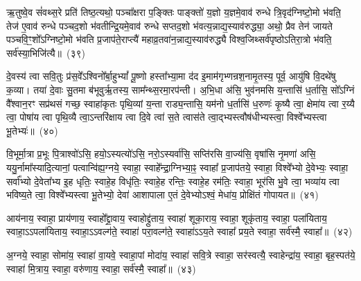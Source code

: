 ऋ॒तुष्वे॒व सं॑वथ्स॒रे प्रति॑ तिष्ठ॒त्यथो॒ पञ्चा᳚क्षरा प॒ङ्क्तिः पाङ्क्तो॑ य॒ज्ञो य॒ज्ञमे॒वाव॑ रुन्धे त्रि॒वृद॑ग्निष्टो॒मो भ॑वति॒ तेज॑ ए॒वाव॑ रुन्धे पञ्चद॒शो भ॑वतीन्द्रि॒यमे॒वाव॑ रुन्धे सप्तद॒शो भ॑वत्य॒न्नाद्य॒स्याव॑रुद्ध्या॒ अथो॒ प्रैव तेन॑ जायते पञ्चवि॒ꣳ॒शो᳚\-ऽग्निष्टो॒मो भ॑वति प्र॒जा\-प॑ते॒राप्त्यै॑ महाव्र॒तवा॑न॒न्नाद्य॒स्याव॑रुद्ध्यै विश्व॒जिथ्सर्व॑पृष्ठो\-ऽतिरा॒त्रो भ॑वति॒ सर्व॑स्या॒भिजि॑त्यै॥~(३९)

{\anuvakamend[{ते व्याव॑र्तन्त प्रवदि॒ता स्या॒मिति॒ स ए॒तं प॑ञ्चरा॒त्रमा सं॑वथ्स॒रो॑\-ऽभिजि॑त्यै}]}%

दे॒वस्य॑ त्वा सवि॒तुः प्र॑स॒वे᳚\-ऽश्विनो᳚र्बा॒हु\-भ्यां᳚ पू॒ष्णो हस्ता᳚भ्या॒मा द॑द इ॒माम॑गृभ्णन्रश॒नामृ॒तस्य॒ पूर्व॒ आयु॑षि वि॒दथे॑षु क॒व्या। तया॑ दे॒वाः सु॒तमा ब॑भूवुर्\mbox{}ऋ॒तस्य॒ साम᳚न्थ्स॒रमा॒रप॑न्ती। अ॒भि॒धा अ॑सि॒ भुव॑नमसि य॒न्तासि॑ ध॒र्तासि॒ सो᳚\-ऽग्निं वै᳚श्वान॒रꣳ सप्र॑थसं गच्छ॒ स्वाहा॑कृतः पृथि॒व्यां य॒न्ता राड्य॒न्तासि॒ यम॑नो ध॒र्तासि॑ ध॒रुणः॑ कृ॒ष्यै त्वा॒ क्षेमा॑य त्वा र॒य्यै त्वा॒ पोषा॑य त्वा पृथि॒व्यै त्वा॒ऽन्तरि॑क्षाय त्वा दि॒वे त्वा॑ स॒ते त्वास॑ते त्वा॒द्भ्यस्त्वौष॑धीभ्यस्त्वा॒ विश्वे᳚भ्यस्त्वा भू॒तेभ्यः॑॥~(४०)

{\anuvakamend[{ध॒रुणः॒ प़ञ्च॑विꣳशतिश्च}]}%

वि॒भूर्मा॒त्रा प्र॒भूः पि॒त्राश्वो॑\-ऽसि॒ हयो॒\-ऽस्यत्यो॑\-ऽसि॒ नरो॒\-ऽस्यर्वा॑सि॒ सप्ति॑रसि वा॒ज्य॑सि॒ वृषा॑सि नृ॒मणा॑ असि॒ ययु॒र्नामा᳚स्यादि॒त्यानां॒ पत्वान्वि॑ह्य॒ग्नये॒ स्वाहा॒ स्वाहे᳚न्द्रा॒ग्निभ्या॒ꣴ॒ स्वाहा᳚ प्र॒जा\-प॑तये॒ स्वाहा॒ विश्वे᳚भ्यो दे॒वेभ्यः॒ स्वाहा॒ सर्वा᳚भ्यो दे॒वेता᳚भ्य इ॒ह धृतिः॒ स्वाहे॒ह विधृ॑तिः॒ स्वाहे॒ह रन्तिः॒ स्वाहे॒ह रम॑तिः॒ स्वाहा॒ भूर॑सि भु॒वे त्वा॒ भव्या॑य त्वा भविष्य॒ते त्वा॒ विश्वे᳚भ्यस्त्वा भू॒तेभ्यो॒ देवा॑ आशापाला ए॒तं दे॒वेभ्यो\-ऽश्वं॒ मेधा॑य॒ प्रोक्षि॑तं गोपायत॥~(४१)

{\anuvakamend[{रन्तिः॒ स्वाहा॒ द्वाविꣳ॑शतिश्च}]}%

आय॑नाय॒ स्वाहा॒ प्राय॑णाय॒ स्वाहो᳚द्द्रा॒वाय॒ स्वाहोद्द्रु॑ताय॒ स्वाहा॑ शूका॒राय॒ स्वाहा॒ शूकृ॑ताय॒ स्वाहा॒ पला॑यिताय॒ स्वाहा॒\-ऽऽ\-पला॑यिताय॒ स्वाहा॒\-ऽऽ\-वल्ग॑ते॒ स्वाहा॑ परा॒वल्ग॑ते॒ स्वाहा॑\-ऽऽ\-य॒ते स्वाहा᳚ प्रय॒ते स्वाहा॒ सर्व॑स्मै॒ स्वाहा᳚॥~(४२)

{\anuvakamend[{आय॑ना॒योत्त॑रमा॒पला॑यिताय॒ षड्विꣳ॑शतिः}]}%

अ॒ग्नये॒ स्वाहा॒ सोमा॑य॒ स्वाहा॑ वा॒यवे॒ स्वाहा॒पां मोदा॑य॒ स्वाहा॑ सवि॒त्रे स्वाहा॒ सर॑स्वत्यै॒ स्वाहेन्द्रा॑य॒ स्वाहा॒ बृह॒स्पत॑ये॒ स्वाहा॑ मि॒त्राय॒ स्वाहा॒ वरु॑णाय॒ स्वाहा॒ सर्व॑स्मै॒ स्वाहा᳚॥~(४३)

{\anuvakamend[{}]}

